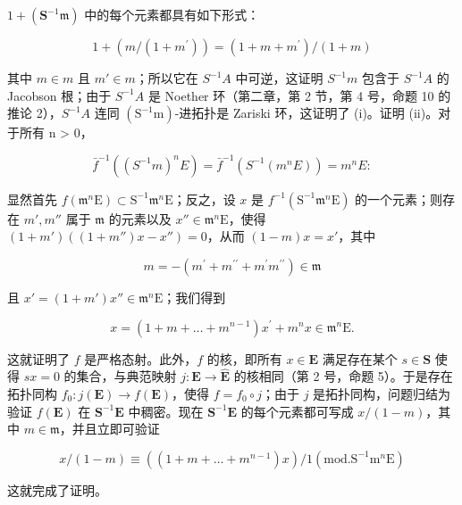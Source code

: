 \(1 + (\mathbf{S}^{-1}\mathfrak{m})\) 中的每个元素都具有如下形式：

\[
1 + (m / \left(1 + m ^ {\prime}\right)) = (1 + m + m ^ {\prime}) / (1 + m)
\]

其中 \(m \in m\) 且 \(m' \in m\)；所以它在 \(S^{-1}A\) 中可逆，这证明 \(S^{-1}m\) 包含于 \(S^{-1}A\) 的 Jacobson 根；由于 \(S^{-1}A\) 是 Noether 环（第二章，第 2 节，第 4 号，命题 10 的推论 2），\(S^{-1}A\) 连同 \((\mathrm{S}^{-1}\mathrm{m})\)-进拓扑是 Zariski 环，这证明了 (i)。证明 (ii)。对于所有 n \textgreater{} 0，

\[
\bar {f} ^ {- 1} ((S ^ {- 1} m) ^ {n} E) = \bar {f} ^ {- 1} (S ^ {- 1} (m ^ {n} E)) = m ^ {n} E:
\]

显然首先 \(f(\mathfrak{m}^n\mathrm{E}) \subset \mathrm{S}^{-1}\mathfrak{m}^n\mathrm{E}\)；反之，设 \(x\) 是 \(f^{-1}(\mathrm{S}^{-1}\mathfrak{m}^n\mathrm{E})\) 的一个元素；则存在 \(m', m''\) 属于 \(\mathfrak{m}\) 的元素以及 \(x'' \in \mathfrak{m}^n\mathrm{E}\)，使得 \((1 + m')((1 + m'')x - x'') = 0\)，从而 \((1 - m)x = x'\)，其中

\[
m = - \left(m ^ {\prime} + m ^ {\prime \prime} + m ^ {\prime} m ^ {\prime \prime}\right) \in \mathfrak {m}
\]

且 \(x' = (1 + m')x'' \in \mathfrak{m}^n\mathrm{E}\)；我们得到

\[
x = (1 + m + \dots + m ^ {n - 1}) x ^ {\prime} + m ^ {n} x \in \mathfrak {m} ^ {n} \mathrm{E}.
\]

这就证明了 \(f\) 是严格态射。此外，\(f\) 的核，即所有 \(x \in \mathbf{E}\) 满足存在某个 \(s \in \mathbf{S}\) 使得 \(sx = 0\) 的集合，与典范映射 \(j: \mathbf{E} \to \hat{\mathbf{E}}\) 的核相同（第 2 号，命题 5）。于是存在拓扑同构 \(f_0: j(\mathbf{E}) \to f(\mathbf{E})\)，使得 \(f = f_0 \circ j\)；由于 \(j\) 是拓扑同构，问题归结为验证 \(f(\mathbf{E})\) 在 \(\mathbf{S}^{-1}\mathbf{E}\) 中稠密。现在 \(\mathbf{S}^{-1}\mathbf{E}\) 的每个元素都可写成 \(x / (1 - m)\)，其中 \(m \in \mathfrak{m}\)，并且立即可验证

\[
x / (1 - m) \equiv ((1 + m + \dots + m ^ {n - 1}) x) / 1 (\mathrm{mod.} \mathrm{S} ^ {- 1} \mathrm{m} ^ {n} \mathrm{E})
\]

这就完成了证明。

